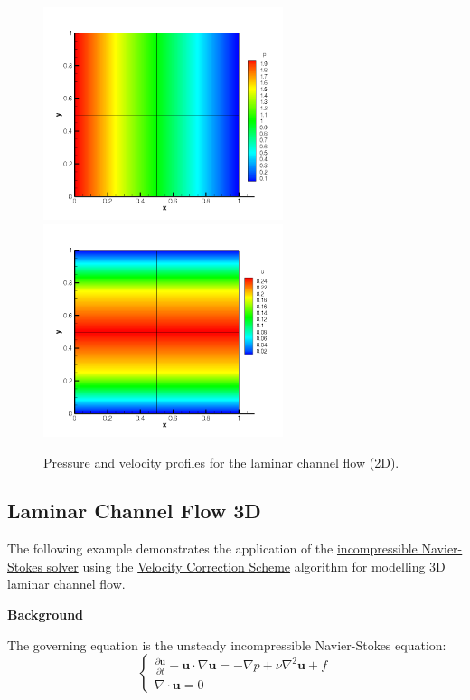 \begin{figure}
\begin{center}
\includegraphics[width=7cm]{Figures/CF2DSKP3PR.png}
\includegraphics[width=7cm]{Figures/CF2DSKP3.png}
\caption{Pressure and velocity profiles for the laminar channel flow (2D).}
\end{center}
\end{figure}

\subsection{Laminar Channel Flow 3D}
The following example demonstrates the application of the \hyperref[IncNSsolver]{incompressible Navier-Stokes solver} using the \hyperref[VCSscheme]{Velocity Correction Scheme} algorithm for modelling 3D laminar channel flow.

\textbf{Background}

The governing equation is the unsteady incompressible Navier-Stokes equation:
\begin{equation}
\begin{cases}
\frac{\partial \textbf{u}}{\partial t} + \textbf{u} \cdot \nabla \textbf{u} = - \nabla p + \nu \nabla^2 \textbf{u} + f \\
\nabla \cdot \textbf{u} = 0
\end{cases}
\end{equation}

